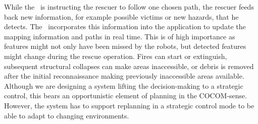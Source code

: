 While the \IC\ is instructing the rescuer to follow one chosen path, the rescuer feeds back new information, for example possible victims or new hazards, that he detects. The \IC\ incorporates this information into the application to update the mapping information and paths in real time. This is of high importance as features might not only have been missed by the robots, but detected features might change during the rescue operation. Fires can start or extinguish, subsequent structural collapses can make areas inaccessible, or debris is removed after the initial reconnaissance making previously inaccessible areas available. Although we are designing a system lifting the decision-making to a strategic control, this bears an opportunistic element of planning in the COCOM-sense. However, the system has to support replanning in a strategic control mode to be able to adapt to changing environments.
